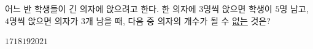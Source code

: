 어느 반 학생들이 긴 의자에 앉으려고 한다. 한 의자에 $3$명씩 앉으면 학생이 $5$명 남고, $4$명씩 앉으면 의자가 $3$개 남을 때, 다음 중 의자의 개수가 될 수 \underline{없는} 것은?
\begin{choices32}{$17$}{$18$}{$19$}{$20$}{$21$}\end{choices32}
